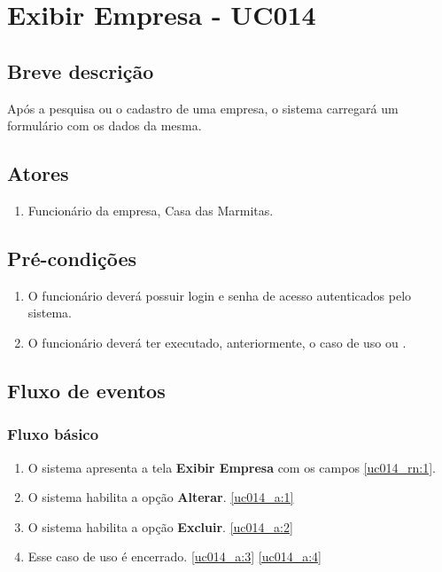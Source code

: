 \chapter{Exibir Empresa - UC014} \label{uc014}

\section{Breve descrição}

Após a pesquisa ou o cadastro de uma empresa, o sistema carregará um formulário com os dados da mesma.

\section{Atores}

\begin{enumerate}
	\item Funcionário da empresa, Casa das Marmitas.
\end{enumerate}

\section{Pré-condições}

\begin{enumerate}
	\item O funcionário deverá possuir login e senha de acesso autenticados pelo sistema.
	\item O funcionário deverá ter executado, anteriormente, o caso de uso  ou .
\end{enumerate}

\section{Fluxo de eventos}

\subsection{Fluxo básico}

\begin{enumerate}[label=P\arabic*]
	\item O sistema apresenta a tela \textbf{Exibir Empresa} com os campos \ref{uc014_rn:1}. \label{uc014_p:1}
	\item O sistema habilita a opção \textbf{Alterar}. \label{uc014_p:2}\ref{uc014_a:1} 
	\item O sistema habilita a opção \textbf{Excluir}. \label{uc014_p:3}\ref{uc014_a:2}
	\item Esse caso de uso é encerrado. \label{uc014_p:4}\ref{uc014_a:3} \ref{uc014_a:4}
\end{enumerate}

